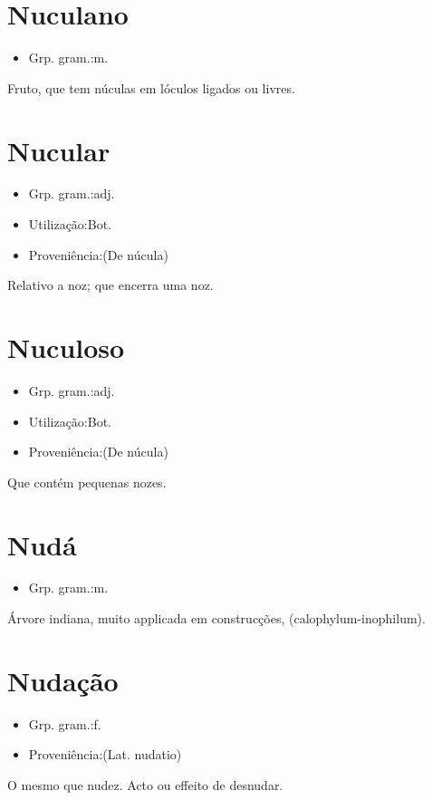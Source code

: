\section{Nuculano}
\begin{itemize}
\item {Grp. gram.:m.}
\end{itemize}
Fruto, que tem núculas em lóculos ligados ou livres.
\section{Nucular}
\begin{itemize}
\item {Grp. gram.:adj.}
\end{itemize}
\begin{itemize}
\item {Utilização:Bot.}
\end{itemize}
\begin{itemize}
\item {Proveniência:(De \textunderscore núcula\textunderscore )}
\end{itemize}
Relativo a noz; que encerra uma noz.
\section{Nuculoso}
\begin{itemize}
\item {Grp. gram.:adj.}
\end{itemize}
\begin{itemize}
\item {Utilização:Bot.}
\end{itemize}
\begin{itemize}
\item {Proveniência:(De \textunderscore núcula\textunderscore )}
\end{itemize}
Que contém pequenas nozes.
\section{Nudá}
\begin{itemize}
\item {Grp. gram.:m.}
\end{itemize}
Árvore indiana, muito applicada em construcções, (\textunderscore calophylum-inophilum\textunderscore ).
\section{Nudação}
\begin{itemize}
\item {Grp. gram.:f.}
\end{itemize}
\begin{itemize}
\item {Proveniência:(Lat. \textunderscore nudatio\textunderscore )}
\end{itemize}
O mesmo que \textunderscore nudez\textunderscore .
Acto ou effeito de desnudar.
